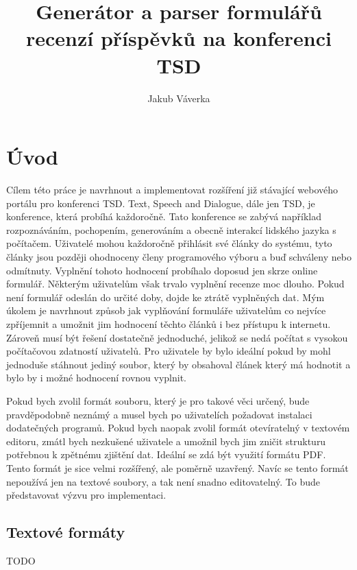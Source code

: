 \documentclass[czech,BP]{thesiskiv}
\author{Jakub Váverka}
\title{Generátor a parser formulářů recenzí příspěvků na konferenci TSD}
\begin{document}
%
\maketitle
\tableofcontents

\chapter{Úvod}
Cílem této práce je navrhnout a implementovat rozšíření již stávající webového portálu pro konferenci TSD. Text, Speech and Dialogue, dále jen TSD, je konference, která probíhá každoročně. Tato konference se zabývá například rozpoznáváním, pochopením, generováním a obecně interakcí lidského jazyka s počítačem. Uživatelé mohou každoročně přihlásit své články do systému, tyto články jsou později ohodnoceny členy programového výboru a buď schváleny nebo odmítnuty. Vyplnění tohoto hodnocení probíhalo doposud jen skrze online formulář. Některým uživatelům však trvalo vyplnění recenze moc dlouho. Pokud není formulář odeslán do určité doby, dojde ke ztrátě vyplněných dat. Mým úkolem je navrhnout způsob jak vyplňování formuláře uživatelům co nejvíce zpříjemnit a umožnit jim hodnocení těchto článků i bez přístupu k internetu. Zároveň musí být řešení dostatečně jednoduché, jelikož se nedá počítat s vysokou počítačovou zdatností uživatelů. Pro uživatele by bylo ideální pokud by mohl jednoduše stáhnout jediný soubor, který by obsahoval článek který má hodnotit a bylo by i možné hodnocení rovnou vyplnit.

Pokud bych zvolil formát souboru, který je pro takové věci určený, bude pravděpodobně neznámý a musel bych po uživatelích požadovat instalaci dodatečných programů. Pokud bych naopak zvolil formát otevíratelný v textovém editoru, zmátl bych nezkušené uživatele a umožnil bych jim zničit strukturu potřebnou k zpětnému zjištění dat. Ideální se zdá být využití formátu PDF. Tento formát je sice velmi rozšířený, ale poměrně uzavřený. Navíc se tento formát nepoužívá jen na textové soubory, a tak není snadno editovatelný. To bude představovat výzvu pro implementaci.

\section{Textové formáty}
TODO
\end{document}
